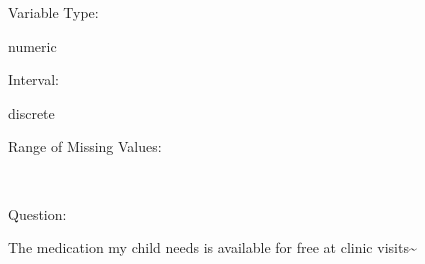\documentclass[
]{article}
\begin{document}
\begin{minipage}[t]{0.3\linewidth}

Variable Type:

\end{minipage}%
\begin{minipage}[t]{0.7\linewidth}

numeric

\end{minipage}

\begin{minipage}[t]{0.3\linewidth}

Interval:

\end{minipage}%
\begin{minipage}[t]{0.7\linewidth}

discrete

\end{minipage}

\begin{minipage}[t]{0.3\linewidth}

Range of Missing Values:

\end{minipage}%
\begin{minipage}[t]{0.7\linewidth}

~

\end{minipage}

\begin{minipage}[t]{0.3\linewidth}

Question:

\end{minipage}%
\begin{minipage}[t]{0.7\linewidth}

The medication my child needs is available for free at clinic
visits\textasciitilde{}

\end{minipage}
\end{document}
